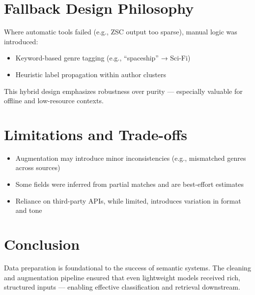 \section{Fallback Design Philosophy}
Where automatic tools failed (e.g., ZSC output too sparse), manual logic was introduced:
\begin{itemize}
    \item Keyword-based genre tagging (e.g., “spaceship” → Sci-Fi)
    \item Heuristic label propagation within author clusters
\end{itemize}

This hybrid design emphasizes robustness over purity — especially valuable for offline and low-resource contexts.

\section{Limitations and Trade-offs}
\begin{itemize}
    \item Augmentation may introduce minor inconsistencies (e.g., mismatched genres across sources)
    \item Some fields were inferred from partial matches and are best-effort estimates
    \item Reliance on third-party APIs, while limited, introduces variation in format and tone
\end{itemize}

\section{Conclusion}
Data preparation is foundational to the success of semantic systems. The cleaning and augmentation pipeline ensured that even lightweight models received rich, structured inputs — enabling effective classification and retrieval downstream.
